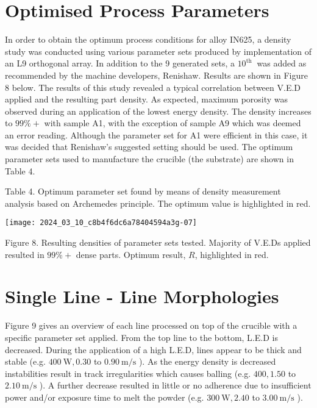 \documentclass[10pt]{article}
\begin{document}
\section*{Optimised Process Parameters}
In order to obtain the optimum process conditions for alloy IN625, a density study was conducted using various parameter sets produced by implementation of an L9 orthogonal array. In addition to the 9 generated sets, a $10^{\text {th }}$ was added as recommended by the machine developers, Renishaw. Results are shown in Figure 8 below. The results of this study revealed a typical correlation between V.E.D applied and the resulting part density. As expected, maximum porosity was observed during an application of the lowest energy density. The density increases to $99 \%+$ with sample A1, with the exception of sample A9 which was deemed an error reading. Although the parameter set for A1 were efficient in this case, it was decided that Renishaw's suggested setting should be used. The optimum parameter sets used to manufacture the crucible (the substrate) are shown in Table 4.

Table 4. Optimum parameter set found by means of density measurement analysis based on Archemedes principle. The optimum value is highlighted in red.

\begin{center}
\texttt{[image: 2024\_03\_10\_c8b4f6dc6a78404594a3g-07]}
\end{center}

Figure 8. Resulting densities of parameter sets tested. Majority of V.E.Ds applied resulted in $99 \%+$ dense parts. Optimum result, $R$, highlighted in red.

\section*{Single Line - Line Morphologies}
Figure 9 gives an overview of each line processed on top of the crucible with a specific parameter set applied. From the top line to the bottom, L.E.D is decreased. During the application of a high L.E.D, lines appear to be thick and stable (e.g. $400 \mathrm{~W}, 0.30$ to $0.90 \mathrm{~m} / \mathrm{s}$ ). As the energy density is decreased instabilities result in track irregularities which causes balling (e.g. $400,1.50$ to $2.10 \mathrm{~m} / \mathrm{s}$ ). A further decrease resulted in little or no adherence due to insufficient power and/or exposure time to melt the powder (e.g. $300 \mathrm{~W}, 2.40$ to $3.00 \mathrm{~m} / \mathrm{s}$ ).
\end{document}
